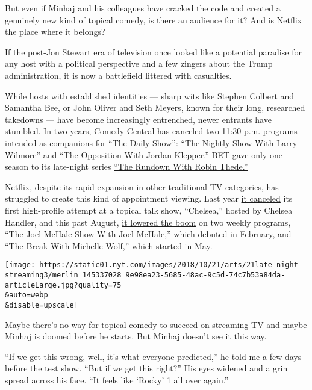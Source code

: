 But even if Minhaj and his colleagues have cracked the code and created
a genuinely new kind of topical comedy, is there an audience for it? And
is Netflix the place where it belongs?

If the post-Jon Stewart era of television once looked like a potential
paradise for any host with a political perspective and a few zingers
about the Trump administration, it is now a battlefield littered with
casualties.

While hosts with established identities --- sharp wits like Stephen
Colbert and Samantha Bee, or John Oliver and Seth Meyers, known for
their long, researched takedowns --- have become increasingly
entrenched, newer entrants have stumbled. In two years, Comedy Central
has canceled two 11:30 p.m. programs intended as companions for ``The
Daily Show'':
\href{https://www.nytimes.com/2016/08/16/business/media/comedy-central-cancels-larry-wilmores-late-night-show.html}{``The
Nightly Show With Larry Wilmore''} and
\href{https://www.nytimes.com/2018/06/15/arts/television/comedy-central-cancels-the-opposition-with-jordan-klepper.html}{``The
Opposition With Jordan Klepper.''} BET gave only one season to its
late-night series
\href{https://www.nytimes.com/2017/10/08/arts/television/on-the-rundown-robin-thede-is-filling-a-void-in-late-night-talk.html}{``The
Rundown With Robin Thede.''}

Netflix, despite its rapid expansion in other traditional TV categories,
has struggled to create this kind of appointment viewing. Last year
\href{https://www.nytimes.com/2017/10/19/arts/television/chelsea-handler-netflix-talk-show.html}{it
canceled} its first high-profile attempt at a topical talk show,
``Chelsea,'' hosted by Chelsea Handler, and this past August,
\href{https://variety.com/2018/tv/news/michelle-wolf-joel-mchale-tnetflix-1202909399/}{it
lowered the boom} on two weekly programs, ``The Joel McHale Show With
Joel McHale,'' which debuted in February, and ``The Break With Michelle
Wolf,'' which started in May.

\texttt{[image: https://static01.nyt.com/images/2018/10/21/arts/21late-night-streaming3/merlin\_145337028\_9e98ea23-5685-48ac-9c5d-74c7b53a84da-articleLarge.jpg?quality=75\\\&auto=webp\\\&disable=upscale]}

Maybe there's no way for topical comedy to succeed on streaming TV and
maybe Minhaj is doomed before he starts. But Minhaj doesn't see it this
way.

``If we get this wrong, well, it's what everyone predicted,'' he told me
a few days before the test show. ``But if we get this right?'' His eyes
widened and a grin spread across his face. ``It feels like `Rocky' 1 all
over again.''

